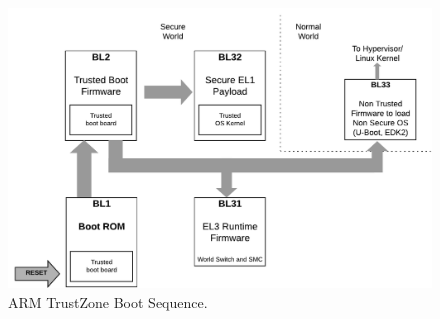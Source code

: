 
\begin{figure}
\centering
\includegraphics[width=\columnwidth]{fig/boot_process.pdf}  
\caption{ARM TrustZone Boot Sequence.}
\label{fig:bootsequence}
\end{figure}



